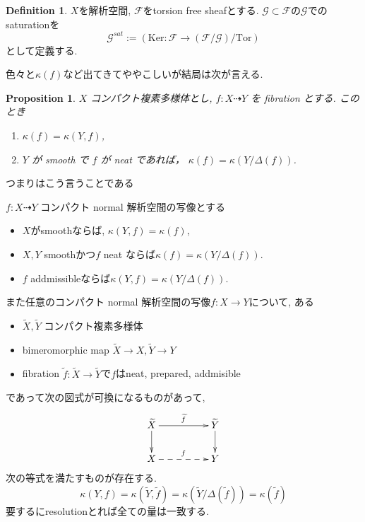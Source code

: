 \documentclass[dvipdfmx,a4paper,11pt]{article} %
\newtheorem{prop}[thm]{Proposition}
\theoremstyle{definition}
\newtheorem{defn}[thm]{Definition}
\theoremstyle{remark}
\numberwithin{equation}{section}
\begin{document}
\begin{defn}
$X$を解析空間, $\mathcal{F}$をtorsion free sheafとする.
$\mathcal{G} \subset \mathcal{F}$の$\mathcal{G}$でのsaturationを
$$
\mathcal{G}^{sat}:= (\mathrm{Ker} : \mathcal{F} \to (\mathcal{F}/\mathcal{G})/\mathrm{Tor})
$$
として定義する. 
\end{defn}

色々と$\kappa(f)$など出てきてややこしいが結局は次が言える.
\begin{prop}\cite[Proposition 1.25]{Cam04}
\label{prop-Cam04-1.25}
$X$ コンパクト複素多様体とし, 
\(f : X \dashrightarrow Y\) を fibration とする.
このとき
\begin{enumerate}
\item \(\kappa(f) = \kappa(Y,f)\),
\item \(Y\) が smooth で \(f\) が neat であれば，
      \(\kappa(f) = \kappa(Y/\Delta(f))\).
\end{enumerate}
\end{prop}

つまりはこう言うことである
\begin{tcolorbox}[mybox]
$f : X \dashrightarrow Y$ コンパクト normal 解析空間の写像とする
\begin{itemize}
\item $X$がsmoothならば, \(\kappa(Y,f) = \kappa(f) \),
\item $X, Y$ smoothかつ$f$ neat ならば\(\kappa(f) = \kappa(Y/\Delta(f))\).
\item $f$ addmissibleならば\(\kappa(Y,f) = \kappa(Y/\Delta(f))\).
\end{itemize}
また任意のコンパクト normal 解析空間の写像$f : X \to Y$について, ある
\begin{itemize}
\item $\widetilde{X}, \widetilde{Y}$ コンパクト複素多様体
\item bimeromorphic map $\widetilde{X} \to X, \widetilde{Y} \to Y$
\item fibration $\widetilde{f} : \widetilde{X} \to \widetilde{Y}$で$f$はneat, prepared, addmisible
\end{itemize}
であって次の図式が可換になるものがあって, 
  \[
\xymatrix@C=50pt@R=20pt{
\widetilde{X}  \ar@{->}[d]\ar@{->}[r]^{\widetilde{f}} &\widetilde{Y} \ar@{->}[d]\\
 X\ar@{-->}[r]^{f} & Y\\
}
\]
次の等式を満たすものが存在する.
$$
\kappa(Y, f) = \kappa(\widetilde{Y}, \widetilde{f}) = \kappa(\widetilde{Y}/\Delta(\widetilde{f}))
=\kappa(\widetilde{f}) 
$$
要するにresolutionとれば全ての量は一致する. 
\end{tcolorbox}
\end{document}
